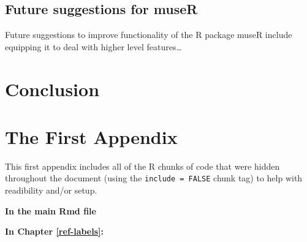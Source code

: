 \documentclass[12pt,twoside]{reedthesis}
\theoremstyle{definition}
\theoremstyle{definition}
\theoremstyle{definition}
\theoremstyle{remark}
\begin{document}
\section{Future suggestions for
museR}\label{future-suggestions-for-muser}

Future suggestions to improve functionality of the R package museR
include equipping it to deal with higher level features\ldots{}

\chapter*{Conclusion}\label{conclusion}

\appendix

\chapter{The First Appendix}\label{the-first-appendix}

This first appendix includes all of the R chunks of code that were
hidden throughout the document (using the \texttt{include\ =\ FALSE}
chunk tag) to help with readibility and/or setup.

\textbf{In the main Rmd file}
\begin{Shaded}
\begin{Highlighting}[]
\NormalTok{(}\OperatorTok{!}
  \NormalTok{(}\NormalTok{, } \NormalTok{)}
\NormalTok{(}\OperatorTok{!}
\OperatorTok{::}\NormalTok{(}\NormalTok{)}
\end{Highlighting}
\end{Shaded}
\textbf{In Chapter \ref{ref-labels}:}
\end{document}
